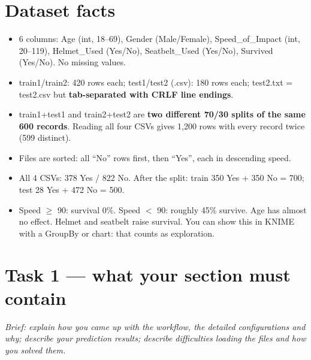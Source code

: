 \documentclass[11pt,a4paper]{article}
\begin{document}
\section{Dataset facts}
\begin{facts}
\begin{itemize}
  \item 6 columns: Age (int, 18--69), Gender (Male/Female), Speed\_of\_Impact (int, 20--119),
        Helmet\_Used (Yes/No), Seatbelt\_Used (Yes/No), Survived (Yes/No). No missing values.
  \item train1/train2: 420 rows each; test1/test2 (.csv): 180 rows each; test2.txt = test2.csv but
        \textbf{tab-separated with CRLF line endings}.
  \item train1+test1 and train2+test2 are \textbf{two different 70/30 splits of the same 600 records}.
        Reading all four CSVs gives 1,200 rows with every record twice (599 distinct).
  \item Files are sorted: all ``No'' rows first, then ``Yes'', each in descending speed.
  \item All 4 CSVs: 378 Yes / 822 No. After the split: train 350 Yes + 350 No = 700; test 28 Yes + 472 No = 500.
  \item Speed $\geq$ 90: survival 0\%. Speed $<$ 90: roughly 45\% survive. Age has almost no effect.
        Helmet and seatbelt raise survival. You can show this in KNIME with a GroupBy or chart:
        that counts as exploration.
\end{itemize}
\end{facts}

\section{Task 1 --- what your section must contain}
\textit{Brief: explain how you came up with the workflow, the detailed configurations and why;
describe your prediction results; describe difficulties loading the files and how you solved them.}
\end{document}
